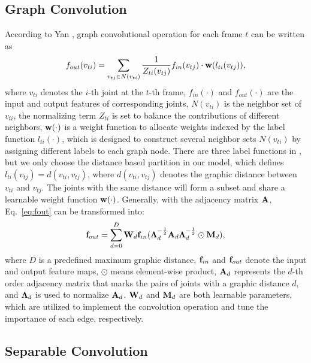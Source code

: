 \documentclass[10pt,journal,compsoc]{IEEEtran}
\begin{document}
\subsection{Graph Convolution}
\label{ssec:graphconv}

According to Yan \etal \cite{yan2018spatial}, graph convolutional operation for each frame $t$ can be written as 
\begin{equation}\label{eq:fout}
  f_{out}(v_{ti}) = \sum_{v_{tj}\in N(v_{ti})}\frac{1}{Z_{ti}(v_{tj})} f_{in}(v_{tj})\cdot {\bf w}(l_{ti}(v_{tj})),
\end{equation}
where $v_{ti}$ denotes the $i$-th joint at the $t$-th frame, $f_{in}(\cdot)$ and $f_{out}(\cdot)$ are the input and output features of corresponding joints, $N(v_{ti})$ is the neighbor set of $v_{ti}$, the normalizing term $Z_{ti}$ is set to balance the contributions of different neighbors, ${\bf w}(\cdot)$ is a weight function to allocate weights indexed by the label function $l_{ti}(\cdot)$, which is designed to construct several neighbor sets $N(v_{ti})$ by assigning different labels to each graph node. There are three label functions in \cite{yan2018spatial}, but we only choose the distance based partition in our model, which defines $l_{ti}(v_{tj})=d(v_{ti},v_{tj})$, where $d(v_{ti},v_{tj})$ denotes the graphic distance between $v_{ti}$ and $v_{tj}$. The joints with the same distance will form a subset and share a learnable weight function ${\bf w}(\cdot)$. Generally, with the adjacency matrix $\bf A$, Eq.~\ref{eq:fout} can be transformed into:
\begin{equation}
  {\bf f}_{out} = \sum_{d=0}^{D} {\bf W}_d {\bf f}_{in} ({\bf \Lambda}_d^{-\frac{1}{2}}{\bf A}_d{\bf \Lambda}_d^{-\frac{1}{2}} \odot {\bf M}_d),
\end{equation}
where $D$ is a predefined maximum graphic distance, ${\bf f}_{in}$ and ${\bf f}_{out}$ denote the input and output feature maps, $\odot$ means element-wise product, ${\bf A}_d$ represents the $d$-th order adjacency matrix that marks the pairs of joints with a graphic distance $d$, and ${\bf \Lambda}_d$ is used to normalize ${\bf A}_d$. ${\bf W}_d$ and ${\bf M}_d$ are both learnable parameters, which are utilized to implement the convolution operation and tune the importance of each edge, respectively.

\subsection{Separable Convolution}
\label{ssec:sepconv}
\end{document}

